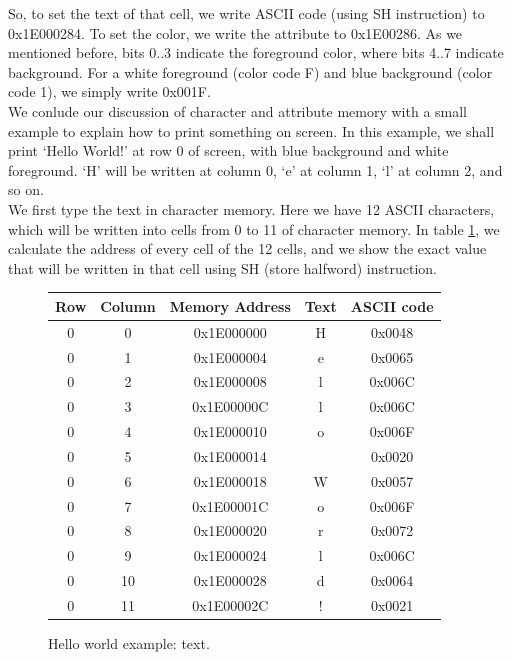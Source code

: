\documentclass[oneside]{book}
\begin{document}
So, to set the text of that cell, we write ASCII code (using SH instruction) to
0x1E000284. To set the color, we write the attribute to 0x1E00286. As we mentioned
before, bits 0..3 indicate the foreground color, where bits 4..7 indicate background.
For a white foreground (color code F) and blue background (color code 1), we
simply write 0x001F.\\

We conlude our discussion of character and attribute memory with a small
example to explain how to print something on screen. In this example,
we shall print `Hello World!' at row 0 of screen, with blue background
and white foreground. `H' will be written at column 0, `e' at column 1,
`l' at column 2, and so on.\\

We first type the text in character memory. Here we have 12 ASCII characters,
which will be written into cells from 0 to 11 of character memory. In table
\ref{hw1}, we  calculate the address of every cell of the 12 cells, and we
show the exact value that will be written in that cell using SH
(store halfword) instruction.\\

\begin{figure}[H]
\begin{center}
\begin{tabular}{|c|c|c|c|c|}

\hline \textbf{Row} & \textbf{Column} &
       \textbf{Memory Address} & \textbf{Text} & \textbf{ASCII code}  \\

\hline 0 & 0  & 0x1E000000 & H & 0x0048 \\
\hline 0 & 1  & 0x1E000004 & e & 0x0065 \\
\hline 0 & 2  & 0x1E000008 & l & 0x006C \\
\hline 0 & 3  & 0x1E00000C & l & 0x006C \\
\hline 0 & 4  & 0x1E000010 & o & 0x006F \\
\hline 0 & 5  & 0x1E000014 &   & 0x0020 \\
\hline 0 & 6  & 0x1E000018 & W & 0x0057 \\
\hline 0 & 7  & 0x1E00001C & o & 0x006F \\
\hline 0 & 8  & 0x1E000020 & r & 0x0072 \\
\hline 0 & 9  & 0x1E000024 & l & 0x006C \\
\hline 0 & 10 & 0x1E000028 & d & 0x0064 \\
\hline 0 & 11 & 0x1E00002C & ! & 0x0021 \\

\hline

\end{tabular}
\end{center}
\caption{Hello world example: text.}
\label{hw1}
\end{figure}
\end{document}
